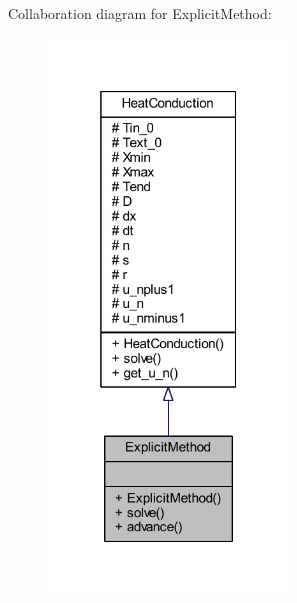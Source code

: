 Collaboration diagram for Explicit\+Method\+:
\nopagebreak
\begin{figure}[H]
\begin{center}
\leavevmode
\includegraphics[width=181pt]{class_explicit_method__coll__graph}
\end{center}
\end{figure}
